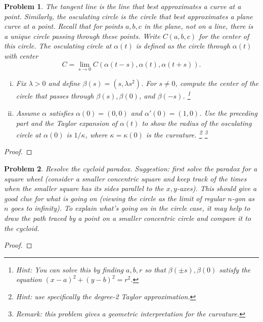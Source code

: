 \documentclass[11pt]{article}
\newtheorem{problem}{Problem}
\begin{document}
\pagebreak


\begin{problem}
The tangent line is the line that best approximates a curve at a point. Similarly, the osculating circle is the circle that best approximates a plane curve at a point. Recall that for points $a,b,c$ in the plane, not on a line, there is a unique circle passing through these points. Write $C(a,b,c)$ for the center of this circle. The osculating circle at $\alpha(t)$ is defined as the circle through $\alpha(t)$ with center 
\[C=\lim_{s\to0} C(\alpha(t-s),\alpha(t),\alpha(t+s)).\]
\begin{enumerate}[(i)]
\item Fix $\lambda>0$ and define $\beta(s)=(s,\lambda s^2)$. For $s\neq0$, compute the center of the circle that passes through $\beta(s),\beta(0)$, and $\beta(-s)$.  \footnote{Hint: You can solve this by finding $a,b,r$ so that $\beta(\pm s),\beta(0)$ satisfy the equation $(x-a)^2+(y-b)^2=r^2$.}
\item Assume $\alpha$ satisfies $\alpha(0)=(0,0)$ and $\alpha'(0)=(1,0)$. Use the preceding part and the Taylor expansion of $\alpha(t)$ to show the radius of the osculating circle at $\alpha(0)$ is $1/\kappa$, where $\kappa=\kappa(0)$ is the curvature. \footnote{Hint: use specifically the degree-2 Taylor approximation.} \footnote{Remark: this problem gives a geometric interpretation for the curvature. }
\end{enumerate} 
\end{problem}

\begin{proof}

\end{proof}

\pagebreak



\begin{problem}
Resolve the cycloid paradox. Suggestion: first solve the paradox for a square wheel (consider a smaller concentric square and keep track of the times when the smaller square has its sides parallel to the $x,y$-axes). This should give a good clue for what is going on (viewing the circle as the limit of regular $n$-gon as $n$ goes to infinity). To explain what's going on in the circle case, it may help to draw the path traced by a point on a smaller concentric circle and compare it to the cycloid. 
\end{problem}

\begin{proof}

\end{proof}
\end{document}
